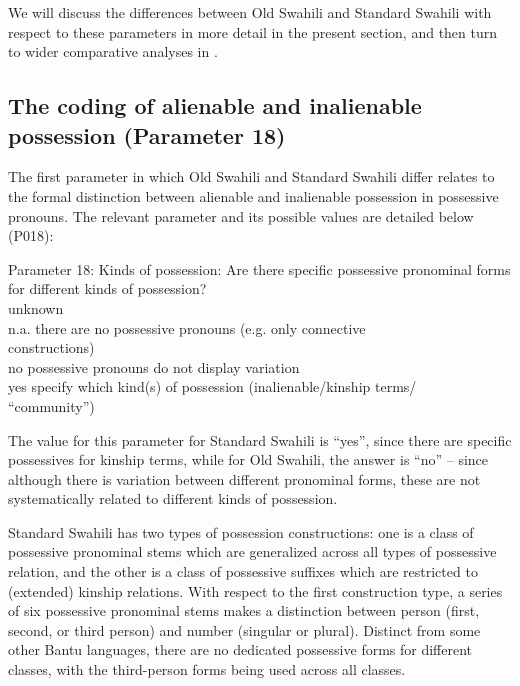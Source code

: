 \documentclass[output=paper]{langscibook}
\begin{document}
We will discuss the differences between Old Swahili and Standard Swahili with respect to these parameters in more detail in the present section, and then turn to wider comparative analyses in . 



\subsection{The coding of alienable and inalienable possession (Parameter 18)}\label{sec:marten:3.1}

The first parameter in which Old Swahili and Standard Swahili differ relates to the formal distinction between alienable and inalienable possession in possessive pronouns. The relevant parameter and its possible values are detailed below (P018):

\ea\label{ex:marten:1}
Parameter 18: Kinds of possession: Are there specific possessive pronominal forms for different kinds of possession? \\
    \hspace{1ex}    {unknown}\\
    {n.a.}     {there are no possessive pronouns (e.g. only connective}\\
    {} {constructions)}\\
    no      {possessive pronouns do not display variation}\\
    yes    {specify which kind(s) of possession (inalienable/kinship terms/}\\
    {} {“community”)}\\
\z



The value for this parameter for Standard Swahili is ``yes'', since there are specific possessives for kinship terms, while for Old Swahili, the answer is ``no'' -- since although there is variation between different pronominal forms, these are not systematically related to different kinds of possession. 

  Standard Swahili has two types of possession constructions: one is a class of possessive pronominal stems which are generalized across all types of possessive relation, and the other is a class of possessive suffixes which are restricted to (extended) kinship relations. With respect to the first construction type, a series of six possessive pronominal stems makes a distinction between person (first, second, or third person) and number (singular or plural). Distinct from some other Bantu languages, there are no dedicated possessive forms for different classes, with the third-person forms being used across all classes. 
\end{document}

